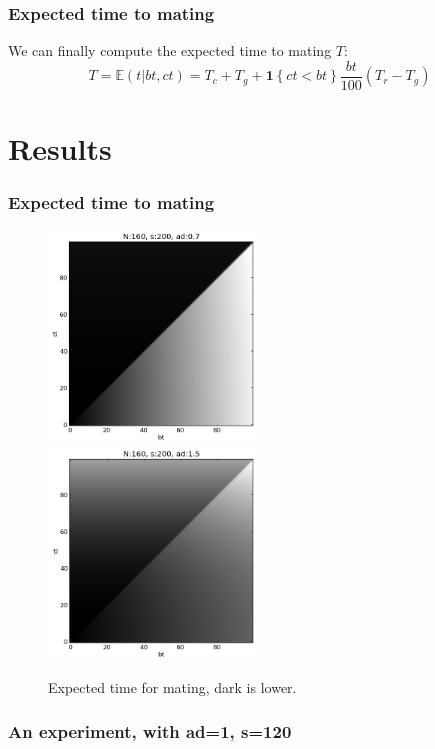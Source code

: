 \documentclass{beamer}
\begin{document}
\begin{frame}
\frametitle{Expected time to mating}
We can finally compute the expected time to mating $T$:
$$T = \mathbb{E}(t|bt,ct) = T_c + T_g + \textbf{1}\left\{ct < bt\right\}\frac{bt}{100} (T_r - T_g)$$
\end{frame}

\section{Results}
\begin{frame}
\frametitle{Expected time to mating}
\begin{figure}
\includegraphics[width=0.5\textwidth]{expected_time_160_7.png}
\includegraphics[width=0.5\textwidth]{expected_time_160_15.png}
\caption{Expected time for mating, dark is lower.}
\end{figure}
\end{frame}

\begin{frame}
\frametitle{An experiment, with ad=1, s=120}

\end{frame}
\end{document}
